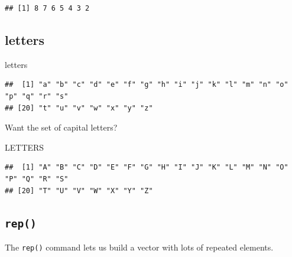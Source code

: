 \documentclass[
]{book}
\newenvironment{Shaded}{\begin{snugshade}}{\end{snugshade}}
\newcommand{\NormalTok}[1]{#1}
\theoremstyle{definition}
\theoremstyle{definition}
\theoremstyle{definition}
\theoremstyle{definition}
\theoremstyle{remark}
\begin{document}
\begin{verbatim}
## [1] 8 7 6 5 4 3 2
\end{verbatim}

\subsection*{letters}\label{letters}

\begin{Shaded}
\begin{Highlighting}[]
\NormalTok{letters}
\end{Highlighting}
\end{Shaded}

\begin{verbatim}
##  [1] "a" "b" "c" "d" "e" "f" "g" "h" "i" "j" "k" "l" "m" "n" "o" "p" "q" "r" "s"
## [20] "t" "u" "v" "w" "x" "y" "z"
\end{verbatim}

Want the set of capital letters?

\begin{Shaded}
\begin{Highlighting}[]
\NormalTok{LETTERS}
\end{Highlighting}
\end{Shaded}

\begin{verbatim}
##  [1] "A" "B" "C" "D" "E" "F" "G" "H" "I" "J" "K" "L" "M" "N" "O" "P" "Q" "R" "S"
## [20] "T" "U" "V" "W" "X" "Y" "Z"
\end{verbatim}

\subsection*{\texorpdfstring{\texttt{rep()}}{rep()}}\label{rep}

The \texttt{rep()} command lets us build a vector with lots of repeated elements.
\end{document}
